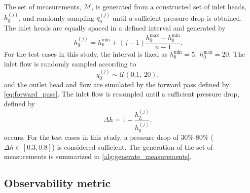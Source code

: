 The set of measurements, $\mathcal{M}$, is generated from a constructed set of inlet heads, $h_0^{(j)}$, and randomly sampling $q_0^{(j)}$ until a sufficient pressure drop is obtained. The inlet heads are equally spaced in a defined interval and generated by
\begin{equation}
\label{eq:h0_gen}
    h_0^{(j)} = h_0^{\min} + (j-1)\dfrac{h_0^{\max}-h_0^{\min}}{n-1}.
\end{equation}
For the test cases in this study, the interval is fixed as $h_0^{\min}=5,\ h_0^{\max}=20$. The inlet flow is randomly sampled according to
\begin{equation}
\label{eq:q0_dist}
    q_0^{(j)} \sim \mathcal{U}(0.1, \ 20),
\end{equation}
and the outlet head and flow are simulated by the forward pass defined by \cref{eq:forward_pass}.
The inlet flow is resampled until a sufficient pressure drop, defined by
\begin{equation}
\label{eq:pressure_drop}
    \Delta h = 1-\frac{h_L^{(j)}}{h_0^{(j)}},
\end{equation}
occurs. For the test cases in this study, a pressure drop of 30\%-80\% ($\Delta h\in [0.3,0.8]$) is considered sufficient. The generation of the set of measurements is summarized in \autoref{alg:generate_measurements}.

\begin{algorithm}[ht]
\caption{Generation of Measurements}
\label{alg:generate_measurements}

\DontPrintSemicolon
{}
\end{algorithm}

\subsection{Observability metric}

